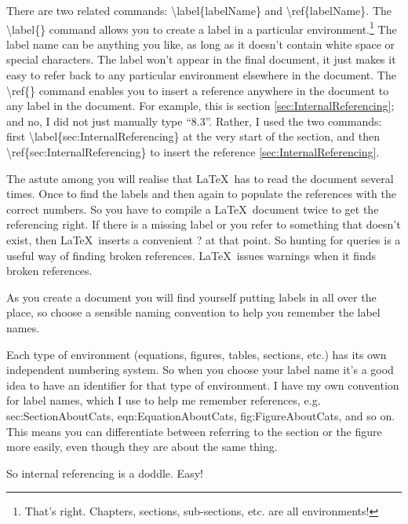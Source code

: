 There are two related commands: {\textbackslash}label\{labelName\}  and {\textbackslash}ref\{labelName\}. The {\textbackslash}label\{\} command allows you to create a label in a particular environment.\footnote{That's right. Chapters, sections, sub-sections, etc. are all environments!} The label name can be anything you like, as long as it doesn't contain white space or special characters. The label won't appear in the final document, it just makes it easy to refer back to any particular environment elsewhere in the document. The {\textbackslash}ref\{\} command enables you to insert a reference anywhere in the document to any label in the document. For example, this is section \ref{sec:InternalReferencing}; and no, I did not just manually type ``8.3''. Rather, I used the two commands: first {\textbackslash}label\{sec:InternalReferencing\} at the very start of the section, and then {\textbackslash}ref\{sec:InternalReferencing\} to insert the reference \ref{sec:InternalReferencing}.

The astute among you will realise that \LaTeX\ has to read the document several times. Once to find the labels and then again to populate the references with the correct numbers. So you have to compile a \LaTeX\ document twice to get the referencing right. If there is a missing label or you refer to something that doesn't exist, then \LaTeX\ inserts a convenient ? at that point. So hunting for queries is a useful way of finding broken references. \LaTeX\ issues warnings when it finds broken references.

As you create a document you will find yourself putting labels in all over the place, so choose a sensible naming convention to help you remember the label names.

Each type of environment (equations, figures, tables, sections, etc.) has its own independent numbering system. So when you choose your label name it's a good idea to have an identifier for that type of environment.  I have my own convention for label names, which I use to help me remember references, e.g.~   sec:SectionAboutCats, eqn:EquationAboutCats, fig:FigureAboutCats, and so on. This means you can differentiate between referring to the section or the figure more easily, even though they are about the same thing.

So internal referencing is a doddle. Easy!
